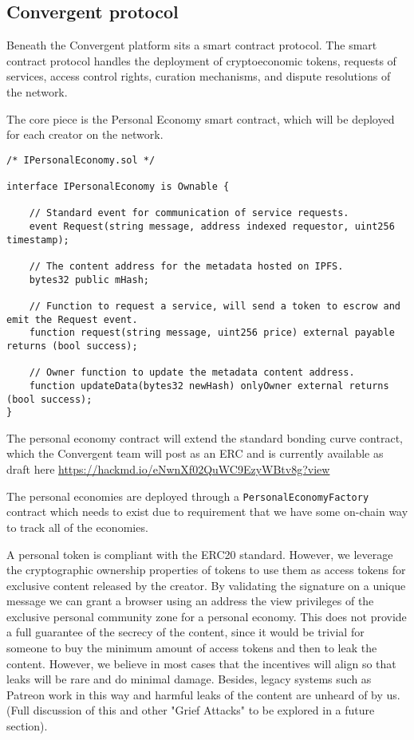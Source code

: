 \documentclass[a4paper]{article}
\begin{document}
\subsection{Convergent protocol}

Beneath the Convergent platform sits a smart contract protocol. The smart contract protocol handles the deployment of cryptoeconomic tokens, requests of services, access control rights, curation mechanisms, and dispute resolutions of the network. 

The core piece is the Personal Economy smart contract, which will be deployed for each creator on the network.

\begin{lstlisting}
/* IPersonalEconomy.sol */

interface IPersonalEconomy is Ownable {

	// Standard event for communication of service requests.
	event Request(string message, address indexed requestor, uint256 timestamp);
    
    // The content address for the metadata hosted on IPFS.
    bytes32 public mHash;
    
    // Function to request a service, will send a token to escrow and emit the Request event.
    function request(string message, uint256 price) external payable returns (bool success);
    
    // Owner function to update the metadata content address.
    function updateData(bytes32 newHash) onlyOwner external returns (bool success);
}
\end{lstlisting}

The personal economy contract will extend the standard bonding curve contract, which the Convergent team will post as an ERC and is currently available as draft here \url{https://hackmd.io/eNwnXf02QuWC9EzyWBtv8g?view}

The personal economies are deployed through a \texttt{PersonalEconomyFactory} contract which needs to exist due to requirement that we have some on-chain way to track all of the economies.

A personal token is compliant with the ERC20 standard. However, we leverage the cryptographic ownership properties of tokens to use them as access tokens for exclusive content released by the creator. By validating the signature on a unique message we can grant a browser using an address the view privileges of the exclusive personal community zone for a personal economy. This does not provide a full guarantee of the secrecy of the content, since it would be trivial for someone to buy the minimum amount of access tokens and then to leak the content. However, we believe in most cases that the incentives will align so that leaks will be rare and do minimal damage. Besides, legacy systems such as Patreon work in this way and harmful leaks of the content are unheard of by us. (Full discussion of this and other "Grief Attacks" to be explored in a future section).
\end{document}
